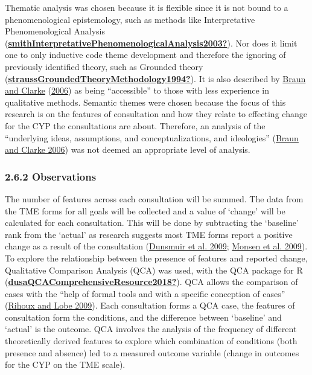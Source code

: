 \documentclass[
]{article}
\begin{document}
Thematic analysis was chosen because it is flexible since it is not
bound to a phenomenological epistemology, such as methods like
Interpretative Phenomenological Analysis
(\protect\hyperlink{ref-smithInterpretativePhenomenologicalAnalysis2003}{\textbf{smithInterpretativePhenomenologicalAnalysis2003?}}).
Nor does it limit one to only inductive code theme development and
therefore the ignoring of previously identified theory, such as Grounded
theory
(\protect\hyperlink{ref-straussGroundedTheoryMethodology1994}{\textbf{straussGroundedTheoryMethodology1994?}}).
It is also described by
\protect\hyperlink{ref-braunUsingThematicAnalysis2006}{Braun and Clarke}
(\protect\hyperlink{ref-braunUsingThematicAnalysis2006}{2006}) as being
``accessible'' to those with less experience in qualitative methods.
Semantic themes were chosen because the focus of this research is on the
features of consultation and how they relate to effecting change for the
CYP the consultations are about. Therefore, an analysis of the
``underlying ideas, assumptions, and conceptualizations, and
ideologies''
(\protect\hyperlink{ref-braunUsingThematicAnalysis2006}{Braun and Clarke
2006}) was not deemed an appropriate level of analysis.

\hypertarget{observations}{%
\subsubsection{2.6.2 Observations}\label{observations}}

The number of features across each consultation will be summed. The data
from the TME forms for all goals will be collected and a value of
`change' will be calculated for each consultation. This will be done by
subtracting the `baseline' rank from the `actual' as research suggests
most TME forms report a positive change as a result of the consultation
(\protect\hyperlink{ref-dunsmuirEvidenceBasedPractice2009}{Dunsmuir et
al. 2009};
\protect\hyperlink{ref-monsenEvaluationPreTraining2009}{Monsen et al.
2009}). To explore the relationship between the presence of features and
reported change, Qualitative Comparison Analysis (QCA) was used, with
the QCA package for R
(\protect\hyperlink{ref-dusaQCAComprehensiveResource2018}{\textbf{dusaQCAComprehensiveResource2018?}}).
QCA allows the comparison of cases with the ``help of formal tools and
with a specific conception of cases''
(\protect\hyperlink{ref-rihouxCaseQualitativeComparative2009}{Rihoux and
Lobe 2009}). Each consultation forms a QCA case, the features of
consultation form the conditions, and the difference between `baseline'
and `actual' is the outcome. QCA involves the analysis of the frequency
of different theoretically derived features to explore which combination
of conditions (both presence and absence) led to a measured outcome
variable (change in outcomes for the CYP on the TME scale).
\end{document}
